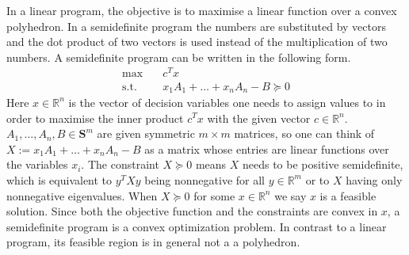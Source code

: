 In a linear program, the objective is to maximise a linear function over a convex polyhedron. In a semidefinite program the numbers are substituted by vectors and the dot product of two vectors is used instead of the multiplication of two numbers. A semidefinite program can be written in the following form. %
%
%
\begin{equation*}%
\begin{alignedat}{2}
\text{max}  \quad & c^T x \ \\
\text{s.t.} \quad & x_1 A_1 + \ldots + x_n A_n - B \succeq 0
\end{alignedat}
\end{equation*}
%
Here $x \in \mathbb{R}^n$ is the vector of decision variables one needs to assign values to in order to maximise the inner product $c^T x$ with the given vector $c \in \mathbb{R}^n$. $A_1, \ldots, A_n, B \in \mathbf{S}^m$ are given symmetric $m \times m$ matrices, so one can think of $X := x_1 A_1 + \ldots + x_n A_n - B$ as a matrix whose entries are linear functions over the variables $x_i$. The constraint $X \succeq 0$ means $X$ needs to be positive semidefinite, which is equivalent to $y^T X y$ being nonnegative for all $y \in \mathbb{R}^m$ or to $X$ having only nonnegative eigenvalues. When $X \succeq 0$ for some $x \in \mathbb{R}^n$ we say $x$ is a feasible solution. Since both the objective function and the constraints are convex in $x$, a semidefinite program is a convex optimization problem. In contrast to a linear program, its feasible region is in general not a a polyhedron.

